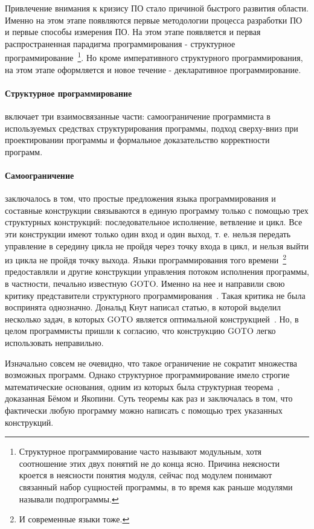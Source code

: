 Привлечение внимания к кризису ПО стало причиной быстрого развития области. Именно на этом этапе появляются первые методологии процесса разработки ПО и первые способы измерения ПО. На этом этапе появляется и первая распространенная парадигма программирования - структурное программирование~\footnote{Структурное программирование часто называют модульным, хотя соотношение этих двух понятий не до конца ясно. Причина неясности кроется в неясности понятия модуля, сейчас под модулем понимают связанный набор сущностей программы, в то время как раньше модулями называли подпрограммы.}. Но кроме императивного структурного программирования, на этом этапе оформляется и новое течение - декларативное программирование.

\paragraph{Структурное программирование} включает три взаимосвязанные части: самоограничение программиста в используемых средствах структурирования программы, подход сверху-вниз при проектировании программы и формальное доказательство корректности программ.

\paragraph{Самоограничение} заключалось в том, что простые предложения языка программирования и составные конструкции связываются в единую программу только с помощью трех структурных конструкций: последовательное исполнение, ветвление и цикл. Все эти конструкции имеют только один вход и один выход, т. е. нельзя передать управление в середину цикла не пройдя через точку входа в цикл, и нельзя выйти из цикла не пройдя точку выхода. Языки программирования того времени~\footnote{И современные языки тоже.} предоставляли и другие конструкции управления потоком исполнения программы, в частности, печально известную GOTO. Именно на нее и направили свою критику представители структурного программирования~\cite{Dijkstra:1968:LEG}. Такая критика не была воспринята однозначно. Дональд Кнут написал статью, в которой выделил несколько задач, в которых GOTO является оптимальной конструкцией~\cite{Knuth:1974:SPG}. Но, в целом программисты пришли к согласию, что конструкцию GOTO легко использовать неправильно.

Изначально совсем не очевидно, что такое ограничение не сократит множества возможных программ. Однако структурное программирование имело строгие математические основания, одним из которых была структурная теорема~\cite{SPT}, доказанная Бёмом и Якопини. Суть теоремы как раз и заключалась в том, что фактически любую программу можно написать с помощью трех указанных конструкций.

